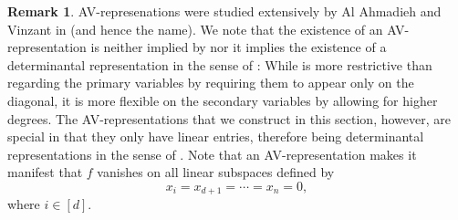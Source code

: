 \documentclass[a4paper,10pt]{amsart}
\theoremstyle{definition}
\newtheorem{rem}[Def]{Remark}
\theoremstyle{plain}
\begin{document}
\begin{rem}\label{rem:comparison}
    AV-represenations were studied extensively by Al Ahmadieh and Vinzant in \cite{al2024determinantal} (and hence the name). We note that the existence of an AV-representation is neither implied by nor it implies the existence of a determinantal representation in the sense of : While  is more restrictive than  regarding the primary variables by requiring them to appear only on the diagonal, it is more flexible on the secondary variables by allowing for higher degrees. The AV-representations that we construct in this section, however, are special in that they only have linear entries, therefore being determinantal representations in the sense of . Note that an AV-representation  makes it manifest that $f$ vanishes on all linear subspaces defined by
    \begin{equation*}
        x_i=x_{d+1}=\cdots=x_n=0,
    \end{equation*}
    where $i\in[d]$.
\end{rem}
\end{document}
